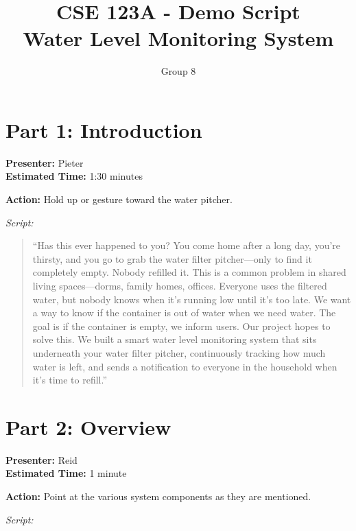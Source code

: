 \documentclass[12pt]{article}
\title{CSE 123A - Demo Script\\Water Level Monitoring System}
\author{Group 8}
\date{}
\begin{document}
\pagestyle{fancy}
\maketitle
\fancyfoot{}
\fancyhead{}

\section*{Part 1: Introduction}
\noindent\textbf{Presenter:} Pieter\\  
\noindent\textbf{Estimated Time:} 1:30 minutes

\noindent\textbf{Action:} Hold up or gesture toward the water pitcher.

\bigskip
\noindent\textit{Script:}

\begin{quote}
``Has this ever happened to you? You come home after a long day, you're thirsty, and you go to grab the water filter pitcher---only to find it completely empty. Nobody refilled it.
This is a common problem in shared living spaces---dorms, family homes, offices. Everyone uses the filtered water, but nobody knows when it's running low until it's too late. We want a way to know if the container is out of water when we need water. The goal is if the container is empty, we inform users.
Our project hopes to solve this. We built a smart water level monitoring system that sits underneath your water filter pitcher, continuously tracking how much water is left, and sends a notification to everyone in the household when it's time to refill.''
\end{quote}

\section*{Part 2: Overview }
\noindent\textbf{Presenter:} Reid\\  
\noindent\textbf{Estimated Time:} 1 minute

\noindent\textbf{Action:} Point at the various system components as they are mentioned.

\bigskip
\noindent\textit{Script:}
\end{document}
